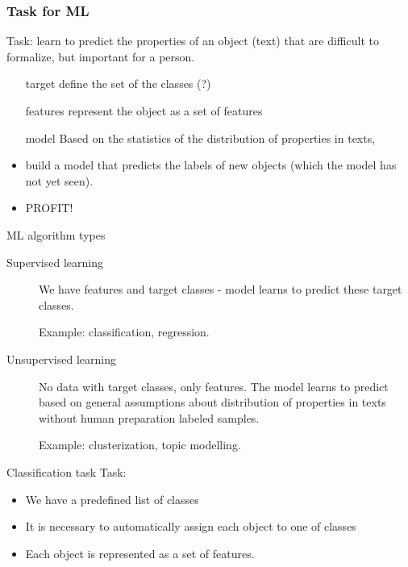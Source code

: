 \documentclass[svgnames]{beamer}
\begin{document}
\begin{frame}
  \frametitle{Task for ML}
  
Task: learn to predict the properties of an object (text) that are difficult to formalize, but important for a person.

  \begin{itemize}
  \item[target] define the set of the classes (?)
  \item[features] represent the object as a set of features
  \item[model] Based on the statistics of the distribution of properties in texts,
  \item build a model that predicts the labels of new objects (which the model has not yet seen).
    \pause
  \item \alert{PROFIT!}
  \end{itemize}
\end{frame}


\begin{frame}{ML algorithm types}
  \begin{description}
  \item[Supervised learning]

 We have features and target classes - model learns to predict these target classes.

  Example: classification, regression.

  \item[Unsupervised learning]

  No data with target classes, only features.
The model learns to predict based on general assumptions about
    distribution of properties in texts without human preparation
    labeled samples.

    Example: clusterization, topic modelling.

  \end{description}

\end{frame}

\begin{frame}{Classification task}
  Task:
  \begin{itemize}
  \item We have a predefined list of classes
  \item It is necessary to automatically assign each object to one of
    classes
  \item Each object is represented as a set of features.
  \end{itemize}
\end{frame}
\end{document}

